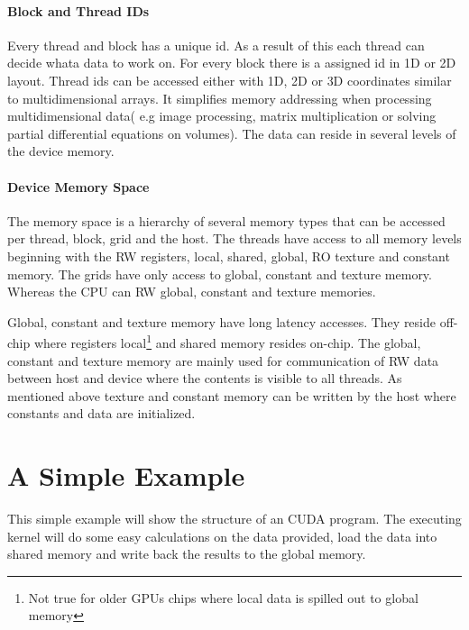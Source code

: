 \paragraph{Block and Thread IDs}%
\label{par:block_and_thread_ids} 
Every thread and block has a unique id. As a result of this each thread can
decide whata data to work on. For every block there is a assigned id in \gls{1D}
or \gls{2D} layout. Thread ids can be accessed either with \gls{1D}, \gls{2D} or
\gls{3D} coordinates similar to multidimensional arrays. It simplifies memory
addressing when processing multidimensional data( e.g image processing, matrix
multiplication or solving partial differential equations on volumes). The data
can reside in several levels of the device memory. %

\paragraph{Device Memory Space}%
\label{par:device_memory_space} 
The memory space is a hierarchy of several memory types that can be accessed per
thread, block, grid and the host. The threads have access to all memory levels
beginning with the \gls{RW} registers, local, shared, global, \gls{RO}
texture and constant memory. The grids have only access to global, constant
and texture memory. Whereas the \gls{CPU} can \gls{RW} global, constant and texture
memories.

Global, constant and texture memory have long latency accesses. They reside
off-chip where registers local\footnote{Not true for older \glspl{GPU} chips
where local data is spilled out to global memory} and shared memory resides
on-chip. The global, constant and texture memory are mainly used for
communication of \gls{RW} data between host and device where the contents is
visible to all threads. As mentioned above texture and constant memory can be
written by the host where constants and data are initialized.


\section{A Simple Example}%
\label{sub:a_simple_example} 
This simple example will show the structure of an \gls{CUDA} program. The executing
kernel will do some easy calculations on the data provided, load the data into
shared memory  and write back the results to the global memory. 

